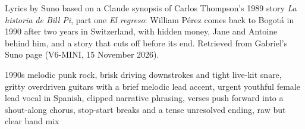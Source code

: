 
\begin{notes}
Lyrics by Suno based on a Claude synopsis of Carlos Thompson's 1989 story \emph{La historia de Bill Pi}, part one \emph{El regreso}: William Pérez comes back to Bogotá in 1990 after two years in Switzerland, with hidden money, Jane and Antoine behind him, and a story that cuts off before its end. Retrieved from Gabriel's Suno page (V6-MINI, 15 November 2026).
\end{notes}
\begin{style}
1990s melodic punk rock, brisk driving downstrokes and tight live-kit snare, gritty overdriven guitars with a brief melodic lead accent, urgent youthful female lead vocal in Spanish, clipped narrative phrasing, verses push forward into a shout-along chorus, stop-start breaks and a tense unresolved ending, raw but clear band mix
\end{style}
